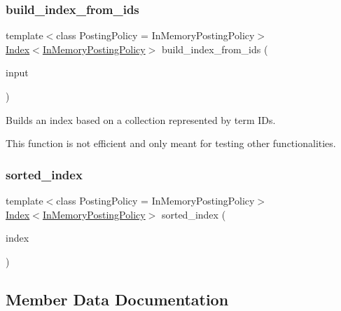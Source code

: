 \subsubsection{\texorpdfstring{build\+\_\+index\+\_\+from\+\_\+ids}{build\_index\_from\_ids}}
{\footnotesize\ttfamily template$<$class Posting\+Policy = In\+Memory\+Posting\+Policy$>$ \\
\hyperlink{classbloodhound_1_1index_1_1Index}{Index}$<$\hyperlink{classbloodhound_1_1index_1_1InMemoryPostingPolicy}{In\+Memory\+Posting\+Policy}$>$ build\+\_\+index\+\_\+from\+\_\+ids (\begin{DoxyParamCaption}\item[{const std\+::vector$<$ std\+::vector$<$ \hyperlink{structbloodhound_1_1TermWeight}{Term\+Weight} $>$$>$ \&}]{input }\end{DoxyParamCaption})\hspace{0.3cm}{\ttfamily [friend]}}

Builds an index based on a collection represented by term I\+Ds.

This function is not efficient and only meant for testing other functionalities. \mbox{\label{classbloodhound_1_1index_1_1Index_aad81f0929f0b03479f3361a23d96573b}} 
\subsubsection{\texorpdfstring{sorted\+\_\+index}{sorted\_index}}
{\footnotesize\ttfamily template$<$class Posting\+Policy = In\+Memory\+Posting\+Policy$>$ \\
\hyperlink{classbloodhound_1_1index_1_1Index}{Index}$<$\hyperlink{classbloodhound_1_1index_1_1InMemoryPostingPolicy}{In\+Memory\+Posting\+Policy}$>$ sorted\+\_\+index (\begin{DoxyParamCaption}\item[{const \hyperlink{classbloodhound_1_1index_1_1Index}{Index}$<$ \hyperlink{classbloodhound_1_1index_1_1InMemoryPostingPolicy}{In\+Memory\+Posting\+Policy} $>$ \&}]{index }\end{DoxyParamCaption})\hspace{0.3cm}{\ttfamily [friend]}}



\subsection{Member Data Documentation}
\mbox{\label{classbloodhound_1_1index_1_1Index_a746d80c2fb411f512726c8d37cad78fc}} 
